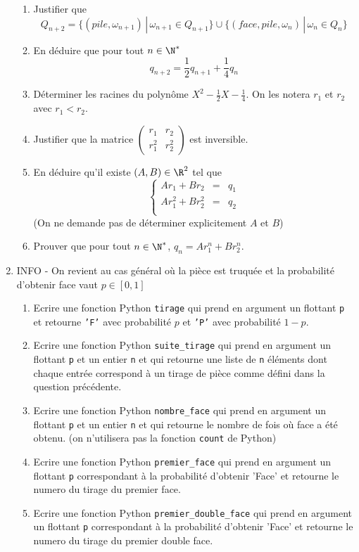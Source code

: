 \documentclass[a4paper, 11pt,reqno]{article}
\begin{document}
\begin{exercice}
\begin{enumerate}
\begin{enumerate}
\item Justifier que $$Q_{n+2} = \{ (pile,\omega_{n+1} ) \, |\, \omega_{n+1}\in Q_{n+1}\} \cup  \{ (face,pile,\omega_{n} ) \, |\, \omega_{n}\in Q_{n}\} $$

\item En déduire que pour tout $n\in \N^*$
$$q_{n+2} =\frac{1}{2}q_{n+1} +\frac{1}{4} q_n$$
\item Déterminer les racines du polynôme $X^2-\frac{1}{2}X -\frac{1}{4}$. On les notera $r_1$ et $r_2$ avec $r_1<r_2$. 

\item Justifier que la matrice $\begin{pmatrix}
r_1 & r_2\\
r_1^2& r_2^2
\end{pmatrix}$ est inversible.
\item En déduire qu'il existe $(A,B)\in \R^2$ tel que 
$$\left\{ \begin{array}{ccc}
Ar_1+Br_2&=&q_1\\
 Ar^2_1+Br^2_2&=&q_2\\
\end{array}\right.$$
(On ne demande pas de déterminer explicitement  $A$ et $B$)
\item Prouver que pour tout $n\in \N^*$, $q_n = Ar_1^n + Br_2^n$.
\end{enumerate}


\item INFO - On revient au cas général où la pièce est truquée et la probabilité d'obtenir face vaut $p\in [0,1]$ \begin{enumerate}
\item Ecrire une fonction Python \texttt{tirage} qui prend en argument un flottant \texttt{p} et retourne \texttt{'F'} avec probabilité $p$ et \texttt{'P'} avec probabilité $1-p$.
\item  Ecrire une fonction Python \texttt{suite\_tirage} qui prend en argument un flottant \texttt{p} et un entier \texttt{n} et  qui retourne une liste de \texttt{n} éléments dont  chaque entrée correspond à un tirage de pièce comme défini dans la question précédente. 
\item Ecrire une fonction Python \texttt{nombre\_face}  qui prend en argument un flottant \texttt{p} et un entier \texttt{n} et  qui retourne le nombre de fois où face a été obtenu. (on n'utilisera pas la fonction \texttt{count} de Python)
\item  Ecrire une fonction Python \texttt{premier\_face} qui prend en argument un flottant \texttt{p} correspondant à la probabilité d'obtenir 'Face' et retourne le numero du tirage du premier face. 
\item  Ecrire une fonction Python \texttt{premier\_double\_face} qui prend en argument un flottant \texttt{p} correspondant à la probabilité d'obtenir 'Face' et retourne le numero du tirage du premier double face. 
\end{enumerate}


\end{enumerate}
\end{exercice}
\end{document}
